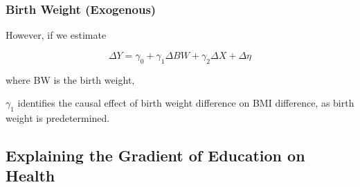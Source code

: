         \subsubsection{Birth Weight (Exogenous)}
            However, if we estimate
            
            $$\Delta Y = \gamma_0+\gamma_1\Delta BW+\gamma_2 \Delta X+\Delta \eta$$
            
            where BW is the birth weight,
            
            $\gamma_1$ identifies the causal effect of birth weight difference on BMI difference, as birth weight is predetermined.





\subsection{Explaining the Gradient of Education on Health}
